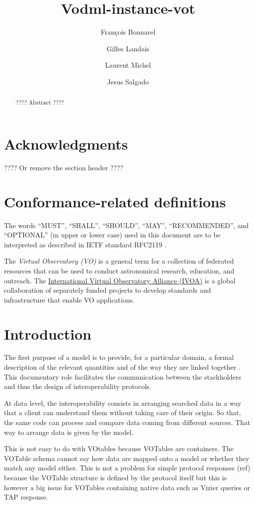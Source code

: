 \documentclass[11pt,a4paper]{ivoa}
\title{Vodml-instance-vot}
\author{François Bonnarel}
\author{Gilles Landais}
\author{Laurent Michel}
\author{Jesus Salgado}
\begin{document}
\begin{abstract}
???? Abstract ????
\end{abstract}


\section*{Acknowledgments}

???? Or remove the section header ????

\section*{Conformance-related definitions}

The words ``MUST'', ``SHALL'', ``SHOULD'', ``MAY'', ``RECOMMENDED'', and
``OPTIONAL'' (in upper or lower case) used in this document are to be
interpreted as described in IETF standard RFC2119 \citep{std:RFC2119}.

The \emph{Virtual Observatory (VO)} is a
general term for a collection of federated resources that can be used
to conduct astronomical research, education, and outreach.
The \href{http://www.ivoa.net}{International
Virtual Observatory Alliance (IVOA)} is a global
collaboration of separately funded projects to develop standards and
infrastructure that enable VO applications.


\section{Introduction}
The first purpose of a model is to provide,  for a particular domain, a formal description of the relevant quantities and of the way they are linked together .
This documentary role facilitates the communication between the stackholders and thus the design of interoperability protocols. 

At data level, the interoperability consists in arranging searched data in a way that a client can understand them without taking care of their origin. So that, the same code can process and compare data coming from different sources.  That way to arrange data is given by the model.

This is not easy to do with VOtables because VOTables are containers. The VOTable schema cannot say how data are mapped onto a model or whether they match any model either. This is not a problem for simple protocol responses (ref) because the VOTable structure is defined by the protocol itself but this is however a big issue for VOTables containing native data such as Vizier queries or TAP response.
\end{document}
